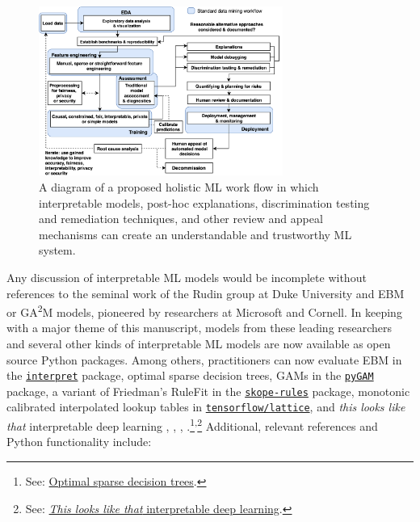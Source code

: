 \documentclass[information,article,submit,moreauthors,pdftex]{definitions/mdpi}
\begin{document}
\begin{figure}[H]
\centering
\includegraphics[width=8cm]{img/blueprint.png}
\caption{A diagram of a proposed holistic ML work flow in which interpretable models, post-hoc explanations, discrimination testing and remediation techniques, and other review and appeal mechanisms can create an understandable and trustworthy ML system.}
\label{fig:blueprint}
\end{figure}   

Any discussion of interpretable ML models would be incomplete without references to the seminal work of the Rudin group at Duke University and EBM or GA\textsuperscript{2}M models, pioneered by researchers at Microsoft and Cornell. In keeping with a major theme of this manuscript, models from these leading researchers and several other kinds of interpretable ML models are now available as open source Python packages. Among others, practitioners can now evaluate EBM in the \href{https://github.com/interpretml/interpret}{\texttt{interpret}} package, optimal sparse decision trees, GAMs in the \href{https://github.com/dswah/pyGAM}{\texttt{pyGAM}} package, a variant of Friedman's RuleFit  in the \href{https://github.com/scikit-learn-contrib/skope-rules}{\texttt{skope-rules}} package, monotonic calibrated interpolated lookup tables in \href{https://github.com/tensorflow/lattice}{\texttt{tensorflow/lattice}}, and \textit{this looks like that} interpretable deep learning \cite{osdt}, \cite{rulefit}, \cite{lattice}, \cite{this_looks_like_that}.\footnote{See: \href{https://github.com/xiyanghu/OSDT}{Optimal sparse decision trees}.}\textsuperscript{,}\footnote{See: \href{https://github.com/cfchen-duke/ProtoPNet}{\textit{This looks like that} interpretable deep learning}.} Additional, relevant references and Python functionality include:
\end{document}
